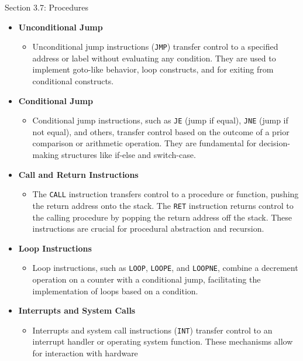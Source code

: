 \begin{notes}{Section 3.7: Procedures}
    \begin{itemize}
        \item \textbf{Unconditional Jump}
        \begin{itemize}
            \item Unconditional jump instructions (\texttt{JMP}) transfer control to a specified address or label without evaluating any condition. They are used to implement goto-like behavior, loop 
            constructs, and for exiting from conditional constructs.
        \end{itemize}
        \item \textbf{Conditional Jump}
        \begin{itemize}
            \item Conditional jump instructions, such as \texttt{JE} (jump if equal), \texttt{JNE} (jump if not equal), and others, transfer control based on the outcome of a prior comparison or 
            arithmetic operation. They are fundamental for decision-making structures like if-else and switch-case.
        \end{itemize}
        \item \textbf{Call and Return Instructions}
        \begin{itemize}
            \item The \texttt{CALL} instruction transfers control to a procedure or function, pushing the return address onto the stack. The \texttt{RET} instruction returns control to the calling 
            procedure by popping the return address off the stack. These instructions are crucial for procedural abstraction and recursion.
        \end{itemize}
        \item \textbf{Loop Instructions}
        \begin{itemize}
            \item Loop instructions, such as \texttt{LOOP}, \texttt{LOOPE}, and \texttt{LOOPNE}, combine a decrement operation on a counter with a conditional jump, facilitating the implementation 
            of loops based on a condition.
        \end{itemize}
        \item \textbf{Interrupts and System Calls}
        \begin{itemize}
            \item Interrupts and system call instructions (\texttt{INT}) transfer control to an interrupt handler or operating system function. These mechanisms allow for interaction with hardware 

\end{itemize}
\end{itemize}
\end{notes}
